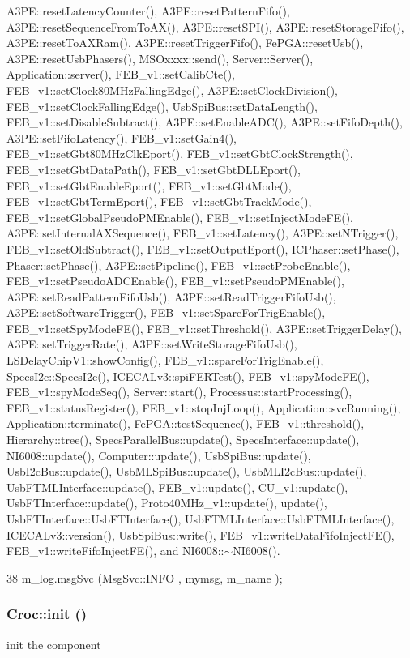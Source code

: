 A3PE::resetLatencyCounter(), A3PE::resetPatternFifo(), A3PE::resetSequenceFromToAX(), A3PE::resetSPI(), A3PE::resetStorageFifo(), A3PE::resetToAXRam(), A3PE::resetTriggerFifo(), FePGA::resetUsb(), A3PE::resetUsbPhasers(), MSOxxxx::send(), Server::Server(), Application::server(), FEB\_\-v1::setCalibCte(), FEB\_\-v1::setClock80MHzFallingEdge(), A3PE::setClockDivision(), FEB\_\-v1::setClockFallingEdge(), UsbSpiBus::setDataLength(), FEB\_\-v1::setDisableSubtract(), A3PE::setEnableADC(), A3PE::setFifoDepth(), A3PE::setFifoLatency(), FEB\_\-v1::setGain4(), FEB\_\-v1::setGbt80MHzClkEport(), FEB\_\-v1::setGbtClockStrength(), FEB\_\-v1::setGbtDataPath(), FEB\_\-v1::setGbtDLLEport(), FEB\_\-v1::setGbtEnableEport(), FEB\_\-v1::setGbtMode(), FEB\_\-v1::setGbtTermEport(), FEB\_\-v1::setGbtTrackMode(), FEB\_\-v1::setGlobalPseudoPMEnable(), FEB\_\-v1::setInjectModeFE(), A3PE::setInternalAXSequence(), FEB\_\-v1::setLatency(), A3PE::setNTrigger(), FEB\_\-v1::setOldSubtract(), FEB\_\-v1::setOutputEport(), ICPhaser::setPhase(), Phaser::setPhase(), A3PE::setPipeline(), FEB\_\-v1::setProbeEnable(), FEB\_\-v1::setPseudoADCEnable(), FEB\_\-v1::setPseudoPMEnable(), A3PE::setReadPatternFifoUsb(), A3PE::setReadTriggerFifoUsb(), A3PE::setSoftwareTrigger(), FEB\_\-v1::setSpareForTrigEnable(), FEB\_\-v1::setSpyModeFE(), FEB\_\-v1::setThreshold(), A3PE::setTriggerDelay(), A3PE::setTriggerRate(), A3PE::setWriteStorageFifoUsb(), LSDelayChipV1::showConfig(), FEB\_\-v1::spareForTrigEnable(), SpecsI2c::SpecsI2c(), ICECALv3::spiFERTest(), FEB\_\-v1::spyModeFE(), FEB\_\-v1::spyModeSeq(), Server::start(), Processus::startProcessing(), FEB\_\-v1::statusRegister(), FEB\_\-v1::stopInjLoop(), Application::svcRunning(), Application::terminate(), FePGA::testSequence(), FEB\_\-v1::threshold(), Hierarchy::tree(), SpecsParallelBus::update(), SpecsInterface::update(), NI6008::update(), Computer::update(), UsbSpiBus::update(), UsbI2cBus::update(), UsbMLSpiBus::update(), UsbMLI2cBus::update(), UsbFTMLInterface::update(), FEB\_\-v1::update(), CU\_\-v1::update(), UsbFTInterface::update(), Proto40MHz\_\-v1::update(), update(), UsbFTInterface::UsbFTInterface(), UsbFTMLInterface::UsbFTMLInterface(), ICECALv3::version(), UsbSpiBus::write(), FEB\_\-v1::writeDataFifoInjectFE(), FEB\_\-v1::writeFifoInjectFE(), and NI6008::$\sim$NI6008().


\begin{DoxyCode}
38 { m_log.msgSvc (MsgSvc::INFO    , mymsg, m_name ); }
\end{DoxyCode}
\hypertarget{classCroc_a0ccc2406507c081f637a4d0346494f09}{
\subsubsection[{init}]{ Croc::init ()}}
\label{classCroc_a0ccc2406507c081f637a4d0346494f09}
init the component

